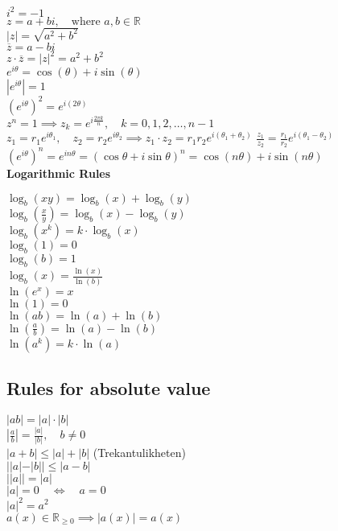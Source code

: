 \documentclass[a4paper,7pt,fleqn]{article}
\begin{document}
\begin{multicols}{3}
\begin{minipage}{\linewidth}
\( i^2 = -1 \) \\ 
\( z = a + bi, \quad \text{where } a, b \in \mathbb{R} \) \\
\( |z| = \sqrt{a^2 + b^2} \) \\
\( \overline{z} = a - bi \) \\
\( z \cdot \overline{z} = |z|^2 = a^2 + b^2 \) \\
\( e^{i\theta} = \cos(\theta) + i\sin(\theta) \) \\
\( |e^{i\theta}| = 1 \) \\
\( \left(e^{i\theta}\right)^2 = e^{i(2\theta)} \) \\
\( z^n = 1 \implies z_k = e^{i\frac{2\pi k}{n}}, \quad k = 0, 1, 2, \dots, n-1 \) \\
\( z_1 = r_1 e^{i\theta_1}, \quad z_2 = r_2 e^{i\theta_2} \implies
z_1 \cdot z_2 = r_1 r_2 e^{i(\theta_1 + \theta_2)} \)
\( \frac{z_1}{z_2} = \frac{r_1}{r_2} e^{i(\theta_1 - \theta_2)} \) \\
\( \left(e^{i\theta}\right)^n = e^{i n \theta} = (\cos\theta + i\sin\theta)^n = \cos(n\theta) + i\sin(n\theta) \) \\





\textbf{Logarithmic Rules}

\(\log_b(xy) = \log_b(x) + \log_b(y)\) \\ 
\(\log_b\left(\frac{x}{y}\right) = \log_b(x) - \log_b(y)\) \\
\(\log_b(x^k) = k \cdot \log_b(x)\) \\
\(\log_b(1) = 0\) \\
\(\log_b(b) = 1\) \\
\(\log_b(x) = \frac{\ln(x)}{\ln(b)}\) \\
\(\ln(e^x) = x\) \\
\(\ln(1) = 0\) \\
\(\ln(ab) = \ln(a) + \ln(b)\) \\
\(\ln\left(\frac{a}{b}\right) = \ln(a) - \ln(b)\) \\
\(\ln(a^k) = k \cdot \ln(a)\)



\end{minipage}
\begin{minipage}{\linewidth}

\subsection{Rules for absolute value} 
\(|ab| = |a| \cdot |b|\)\\
\(\left| \frac{a}{b} \right| = \frac{|a|}{|b|}, \quad b \neq 0\)\\
\(|a + b| \leq |a| + |b|\)  (Trekantulikheten)\\
\(||a| - |b|| \leq |a - b|\)\\
\(||a|| = |a|\)\\
\(|a| = 0 \quad \Leftrightarrow \quad a = 0\)\\
\(|a|^2 = a^2\)\\
\(a(x) \in \mathbb{R}_{\geq 0} \implies |a(x)| = a(x)\)\\


\end{minipage}
\end{multicols}
\end{document}
